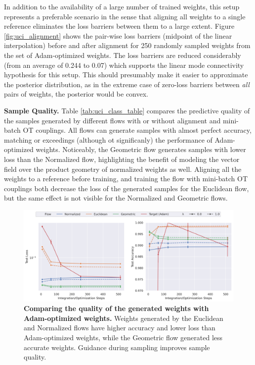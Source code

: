 In addition to the availability of a large number of trained weights, this setup represents a preferable scenario in the sense that aligning all weights to a single reference eliminates the loss barriers between them to a large extent. Figure \ref{fig:uci_alignment} shows the pair-wise loss barriers (midpoint of the linear interpolation) before and after alignment for 250 randomly sampled weights from the set of Adam-optimized weights. The loss barriers are reduced considerably (from an average of 0.244 to 0.07) which supports the linear mode connectivity hypothesis for this setup. This should presumably make it easier to approximate the posterior distribution, as in the extreme case of zero-loss barriers between \textit{all} pairs of weights, the posterior would be convex. 

\textbf{Sample Quality.} Table \ref{tab:uci_class_table} compares the predictive quality of the samples generated by different flows with or without alignment and mini-batch OT couplings. All flows can generate samples with almost perfect accuracy, matching or exceedings (although ot significanly) the performance of Adam-optimized weights. Noticeably, the Geometric flow generates samples with lower loss than the Normalized flow, highlighting the benefit of modeling the vector field over the product geometry of normalized weights as well. Aligning all the weights to a reference before training, and training the flow with mini-batch OT couplings both decrease the loss of the generated samples for the Euclidean flow, but the same effect is not visible for the Normalized and Geometric flows. 

\begin{figure}[t!]
    \centering
    \includegraphics[width=\linewidth]{figures/uci_17/uci_17_steps_both.png}
    \caption{\label{fig:uci_steps}\textbf{Comparing the quality of the generated weights with Adam-optimized weights.} Weights generated by the Euclidean and Normalized flows have higher accuracy and lower loss than Adam-optimized weights, while the Geometric flow generated less accurate weights. Guidance during sampling improves sample quality.} 
\end{figure}

